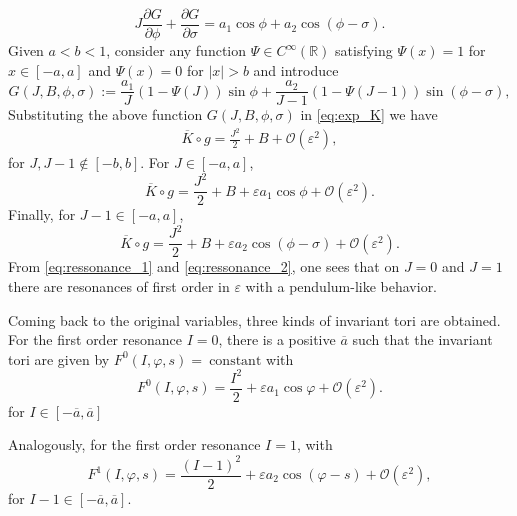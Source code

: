 \documentclass[a4paper,10pt]{article}
\theoremstyle{definition}
\begin{document}
\begin{equation*}
J\frac{\partial G}{\partial\phi} + \frac{\partial G}{\partial \sigma } = a_{1}\cos\phi + a_{2}\cos(\phi-\sigma).
\end{equation*}
Given $a <b<1$, consider any function $\Psi \in C^{\infty}(\mathbb{R})$ satisfying $\Psi(x) = 1$ for $x\in \left[-a,a\right]$ and $\Psi(x) = 0$ for $\left|x\right| > b$ and introduce
\begin{equation*}
G(J,B,\phi,\sigma) := \frac{a_{1}}{J}\left(1-\Psi(J)\right)\sin\phi + \frac{a_{2}}{J-1}\left(1-\Psi(J-1)\right)\sin(\phi - \sigma),
\end{equation*}
Substituting the above function $G(J,B,\phi,\sigma)$ in \eqref{eq:exp_K} we have
\begin{eqnarray}
\overline{K}\circ g =\frac{J^2}{2} + B + \mathcal{O}(\varepsilon^2) , \label{eq:invariant_tori_nr}
\end{eqnarray}
for $J,J-1 \notin [-b,b]$.
For $J\in [-a,a]$,
\begin{equation}
\overline{K}\circ g = \frac{J^2}{2} + B + \varepsilon a_{1}\cos\phi + \mathcal{O}(\varepsilon^2). \label{eq:ressonance_1}
\end{equation}
Finally, for $J-1 \in [-a,a]$,
\begin{equation}
\overline{K}\circ g = \frac{J^2}{2} + B + \varepsilon a_{2}\cos(\phi-\sigma) + \mathcal{O}(\varepsilon^2). \label{eq:ressonance_2}
\end{equation}
From \eqref{eq:ressonance_1} and \eqref{eq:ressonance_2}, one sees that on $J = 0$ and $J = 1$ there are resonances of first order in $\varepsilon$ with a pendulum-like behavior.

Coming back to the original variables, three kinds of invariant tori are obtained.
For the first order resonance $ I = 0 $, there is a positive $\overline{a}$ such that the invariant tori are given by $F^{0}(I,\varphi,s)=~\text{constant}$ with
\begin{equation}
F^0(I,\varphi,s) = \frac{I^2}{2} + \varepsilon a_{1}\cos\varphi  + \mathcal{O}(\varepsilon^2).\label{eq:invariant_tori_i=0}
\end{equation}
for $I \in \left[-\overline{a},\overline{a}\right]$

Analogously, for the first order resonance $ I = 1 $, with
\begin{equation*}
F^1(I,\varphi,s) = \frac{(I-1)^2}{2} + \varepsilon a_{2} \cos(\varphi-s) + \mathcal{O}(\varepsilon^2),\label{eq:invariant_tori_i=1}
\end{equation*}
for $I-1 \in \left[-\overline{a},\overline{a}\right]$.
\end{document}
